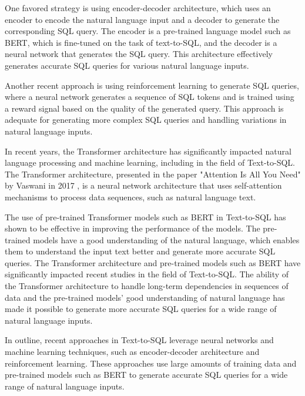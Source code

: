 One favored strategy is using encoder-decoder architecture, which uses an encoder to encode the natural language input and a decoder to generate the corresponding SQL query. The encoder is a pre-trained language model such as BERT, which is fine-tuned on the task of text-to-SQL, and the decoder is a neural network that generates the SQL query. This architecture effectively generates accurate SQL queries for various natural language inputs.

Another recent approach is using reinforcement learning to generate SQL queries, where a neural network generates a sequence of SQL tokens and is trained using a reward signal based on the quality of the generated query. This approach is adequate for generating more complex SQL queries and handling variations in natural language inputs.

In recent years, the Transformer architecture has significantly impacted natural language processing and machine learning, including in the field of Text-to-SQL. The Transformer architecture, presented in the paper "Attention Is All You Need" by Vaswani in 2017 \cite{https://doi.org/10.48550/arxiv.1706.03762}, is a neural network architecture that uses self-attention mechanisms to process data sequences, such as natural language text.


The use of pre-trained Transformer models such as BERT in Text-to-SQL has shown to be effective in improving the performance of the models. The pre-trained models have a good understanding of the natural language, which enables them to understand the input text better and generate more accurate SQL queries.
The Transformer architecture and pre-trained models such as BERT have significantly impacted recent studies in the field of Text-to-SQL. The ability of the Transformer architecture to handle long-term dependencies in sequences of data and the pre-trained models' good understanding of natural language has made it possible to generate more accurate SQL queries for a wide range of natural language inputs.

In outline, recent approaches in Text-to-SQL leverage neural networks and machine learning techniques, such as encoder-decoder architecture and reinforcement learning. These approaches use large amounts of training data and pre-trained models such as BERT to generate accurate SQL queries for a wide range of natural language inputs.